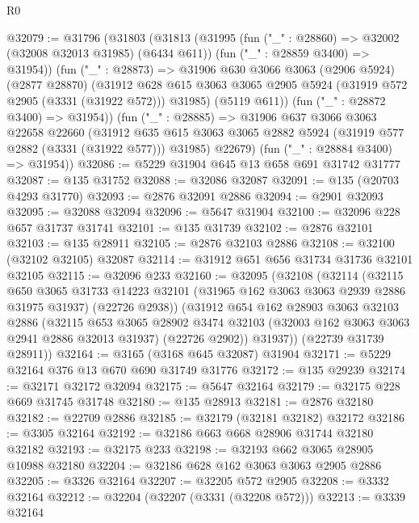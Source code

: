 \begin{lexlean}{R0}
\begin{coremodule}
@32079 := @31796
    (@31803
      (@31813
        (@31995
          (fun ("_" : @28860) => @32002 (@32008 @32013 @31985) (@6434 @611))
          (fun ("_" : @28859 @3400) => @31954))
        (fun ("_" : @28873) =>
        @31906
          @630
          @3066
          @3063
          (@2906 @5924)
          (@2877 @28870)
          (@31912
            @628
            @615
            @3063
            @3065
            @2905
            @5924
            (@31919 @572 @2905 (@3331 (@31922 @572)))
            @31985)
          (@5119 @611))
        (fun ("_" : @28872 @3400) => @31954))
      (fun ("_" : @28885) =>
      @31906
        @637
        @3066
        @3063
        @22658
        @22660
        (@31912 @635 @615 @3063 @3065 @2882 @5924 (@31919 @577 @2882 (@3331 (@31922 @577))) @31985)
        @22679)
      (fun ("_" : @28884 @3400) => @31954))
@32086 := @5229 @31904 @645 @13 @658 @691 @31742 @31777
@32087 := @135 @31752
@32088 := @32086 @32087
@32091 := @135 (@20703 @4293 @31770)
@32093 := @2876 @32091 @2886
@32094 := @2901 @32093
@32095 := @32088 @32094
@32096 := @5647 @31904
@32100 := @32096 @228 @657 @31737 @31741
@32101 := @135 @31739
@32102 := @2876 @32101
@32103 := @135 @28911
@32105 := @2876 @32103 @2886
@32108 := @32100 (@32102 @32105) @32087
@32114 := @31912 @651 @656 @31734 @31736 @32101 @32105
@32115 := @32096 @233
@32160 := @32095
    (@32108
      (@32114
        (@32115
          @650
          @3065
          @31733
          @14223
          @32101
          (@31965 @162 @3063 @3063 @2939 @2886 @31975 @31937)
          (@22726 @2938))
        (@31912
          @654
          @162
          @28903
          @3063
          @32103
          @2886
          (@32115
            @653
            @3065
            @28902
            @3474
            @32103
            (@32003 @162 @3063 @3063 @2941 @2886 @32013 @31937)
            (@22726 @2902))
          @31937))
      (@22739 @31739 @28911))
@32164 := @3165 (@3168 @645 @32087) @31904
@32171 := @5229 @32164 @376 @13 @670 @690 @31749 @31776
@32172 := @135 @29239
@32174 := @32171 @32172 @32094
@32175 := @5647 @32164
@32179 := @32175 @228 @669 @31745 @31748
@32180 := @135 @28913
@32181 := @2876 @32180
@32182 := @22709 @2886
@32185 := @32179 (@32181 @32182) @32172
@32186 := @3305 @32164
@32192 := @32186 @663 @668 @28906 @31744 @32180 @32182
@32193 := @32175 @233
@32198 := @32193 @662 @3065 @28905 @10988 @32180
@32204 := @32186 @628 @162 @3063 @3063 @2905 @2886
@32205 := @3326 @32164
@32207 := @32205 @572 @2905
@32208 := @3332 @32164
@32212 := @32204 (@32207 (@3331 (@32208 @572)))
@32213 := @3339 @32164

\end{coremodule}
\end{lexlean}
